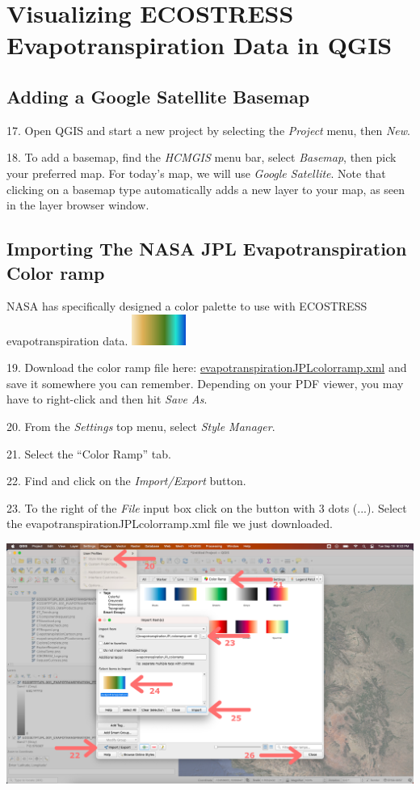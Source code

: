 \documentclass[oneside,a4paper,11pt,explicit]{book}
\begin{document}
\section{Visualizing ECOSTRESS Evapotranspiration Data in QGIS}

\subsection{Adding a Google Satellite Basemap}

17. Open QGIS and start a new project by selecting the \textit{Project} menu, then \textit{New}.

18. To add a basemap, find the \textit{HCMGIS} menu bar, select \textit{Basemap}, then pick your preferred map. For today's map, we will use \textit{Google Satellite}. Note that clicking on a basemap type automatically adds a new layer to your map, as seen in the layer browser window.

\subsection{Importing The NASA JPL Evapotranspiration Color ramp}

NASA has specifically designed a color palette to use with ECOSTRESS evapotranspiration data. \includegraphics[height= 1cm]{ETcolors.png} 

\vspace{.5em}

19. Download the color ramp file here: \href{https://jeremydforsythe.github.io/icecream-tutorials/Tutorial8_Evapotranspiration/evapotranspirationJPLcolorramp.xml}{evapotranspirationJPLcolorramp.xml} and save it somewhere you can remember. Depending on your PDF viewer, you may have to right-click and then hit \textit{Save As}.

20. From the \textit{Settings} top menu, select \textit{Style Manager}.

21. Select the ``Color Ramp'' tab.

22. Find and click on the \textit{Import/Export} button.

23. To the right of the \textit{File} input box click on the button with 3 dots (...). Select the evapotranspirationJPLcolorramp.xml file we just downloaded.

\centerline{\includegraphics[width=\textwidth]{ImportColorramp.png}} 
\end{document}
